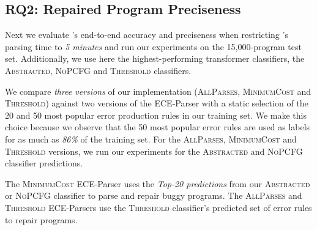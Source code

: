 \subsection{RQ2: Repaired Program Preciseness}
\label{sec:eval:precise}

Next we evaluate \toolname's end-to-end accuracy and preciseness when
restricting \toolname's parsing time to \emph{5 minutes} and run our experiments
on the 15,000-program test set. Additionally, we use here the highest-performing
transformer classifiers, \ie the \textsc{Abstracted}, \textsc{NoPCFG} and
\textsc{Threshold} classifiers.

We compare \emph{three versions} of our \toolname implementation
(\textsc{AllParses}, \textsc{MinimumCost} and \textsc{Threshold}) against two
versions of the ECE-Parser with a static selection of the 20 and 50 most popular
error production rules in our training set. We make this choice because we
observe that the 50 most popular error rules are used as labels for as much as
\emph{86\%} of the training set. For the \textsc{AllParses},
\textsc{MinimumCost} and \textsc{Threshold} versions, we run our experiments for
the \textsc{Abstracted} and \textsc{NoPCFG} classifier predictions.

The \textsc{MinimumCost} ECE-Parser uses the \emph{Top-20 predictions} from our
\textsc{Abstracted} or \textsc{NoPCFG} classifier to parse and repair buggy
programs. The \textsc{AllParses} and \textsc{Threshold} ECE-Parsers use the
\textsc{Threshold} classifier's predicted set of error rules to repair programs.

